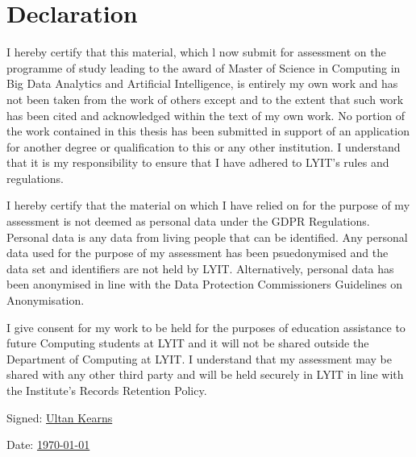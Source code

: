 \documentclass[a4paper,11pt]{report}
\begin{document}
\chapter*{Declaration}

I hereby certify that this material, which l now submit for assessment on the programme of study leading to the award of Master of Science in Computing in Big Data Analytics and Artificial Intelligence, is entirely my own work and has not been taken from the work of others except and to the extent that such work has been cited and acknowledged within the text of my own work. No portion of the work contained in this thesis has been submitted in support of an application for another degree or qualification to this or any other institution. I understand that it is my responsibility to ensure that I have adhered to LYIT’s rules and regulations. 
\bigskip

I hereby certify that the material on which I have relied on for the purpose of my assessment is not deemed as personal data under the GDPR Regulations. Personal data is any data from living people that can be identified. Any personal data used for the purpose of my assessment has been psuedonymised and the data set and identifiers are not held by LYIT. Alternatively, personal data has been anonymised in line with the Data Protection Commissioners Guidelines on Anonymisation.
\bigskip

I give consent for my work to be held for the purposes of education assistance to future Computing students at LYIT and it will not be shared outside the Department of Computing at LYIT. I understand that my assessment may be shared with any other third party and will be held securely in LYIT in line with the Institute's Records Retention Policy. 

\vspace{20pt}

\hspace{60pt} Signed: \underline{\quad \quad Ultan Kearns\hspace{240pt}} 


\bigskip

\hspace{70pt} Date: \underline{\quad \quad\today\hspace{150pt}} 


\listoffigures
\listoftables






\printbibliography
\end{document}
